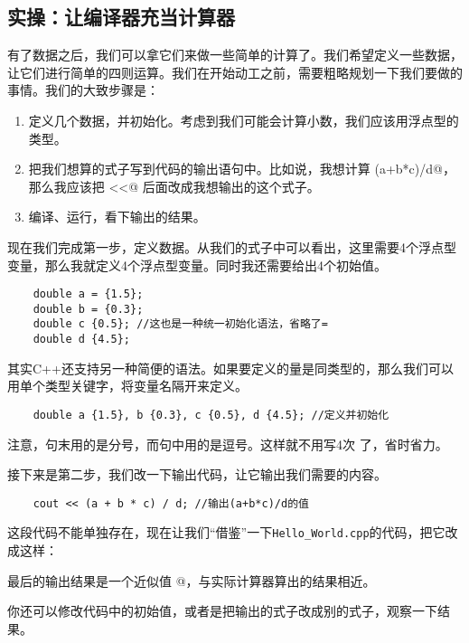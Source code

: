 \subsection*{实操：让编译器充当计算器}
有了数据之后，我们可以拿它们来做一些简单的计算了。我们希望定义一些数据，让它们进行简单的四则运算。我们在开始动工之前，需要粗略规划一下我们要做的事情。我们的大致步骤是：
\begin{enumerate}
    \item 定义几个数据，并初始化。考虑到我们可能会计算小数，我们应该用浮点型的 \lstinline@double@ 类型。
    \item 把我们想算的式子写到代码的输出语句中。比如说，我想计算 \lstinline@(a+b*c)/d@，那么我应该把 \lstinline@cout<<@ 后面改成我想输出的这个式子。    \item 编译、运行，看下输出的结果。
\end{enumerate}\par
现在我们完成第一步，定义数据。从我们的式子中可以看出，这里需要4个浮点型变量，那么我就定义4个浮点型变量。同时我还需要给出4个初始值。
\begin{lstlisting}
    double a = {1.5};
    double b = {0.3};
    double c {0.5}; //这也是一种统一初始化语法，省略了=
    double d {4.5};
\end{lstlisting}
其实C++还支持另一种简便的语法。如果要定义的量是同类型的，那么我们可以用单个类型关键字，将变量名隔开来定义。
\begin{lstlisting}
    double a {1.5}, b {0.3}, c {0.5}, d {4.5}; //定义并初始化
\end{lstlisting}
注意，句末用的是分号，而句中用的是逗号。这样就不用写4次 \lstinline@double@ 了，省时省力。\par
接下来是第二步，我们改一下输出代码，让它输出我们需要的内容。
\begin{lstlisting}
    cout << (a + b * c) / d; //输出(a+b*c)/d的值
\end{lstlisting}\par
这段代码不能单独存在，现在让我们``借鉴''一下\texttt{Hello\_World.cpp}的代码，把它改成这样：

最后的输出结果是一个近似值 @，与实际计算器算出的结果相近。\par
你还可以修改代码中的初始值，或者是把输出的式子改成别的式子，观察一下结果。\par

